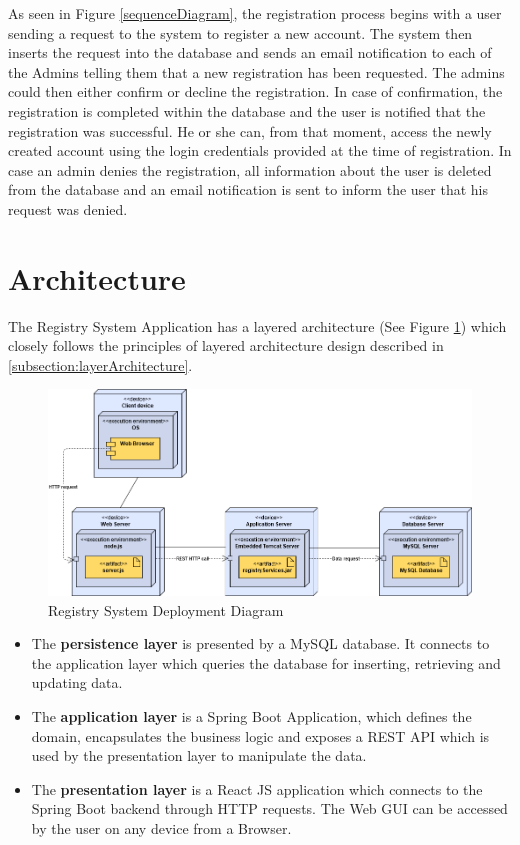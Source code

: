 As seen in Figure \ref{sequenceDiagram}, the registration process begins with a user sending a request to the system to register a new account. The system then inserts the request into the database and sends an email notification to each of the Admins telling them that a new registration has been requested. The admins could then either confirm or decline the registration. In case of confirmation, the registration is completed within the database and the user is notified that the registration was successful. He or she can, from that moment, access the newly created account using the login credentials provided at the time of registration. In case an admin denies the registration, all information about the user is deleted from the database and an email notification is sent to inform the user that his request was denied.



\section{Architecture}
\label{section:architecture}

The Registry System Application has a layered architecture (See Figure \ref{deployment}) which closely follows the principles of layered architecture design described in \ref{subsection:layerArchitecture}.

\begin{figure}[H]
    \centering
    \includegraphics[width=6.5in]{images/deployment}
    \caption{Registry System Deployment Diagram}
    \label{deployment}
\end{figure}

\begin{itemize}
    \item The \textbf{persistence layer} is presented by a MySQL database. It connects to the application layer which queries the database for inserting, retrieving and updating data.
    \item The \textbf{application layer} is a Spring Boot Application, which defines the domain, encapsulates the business logic and exposes a REST API which is used by the presentation layer to manipulate the data.
    \item The \textbf{presentation layer} is a React JS application which connects to the Spring Boot backend through HTTP requests. The Web GUI can be accessed by the user on any device from a Browser.
\end{itemize}

